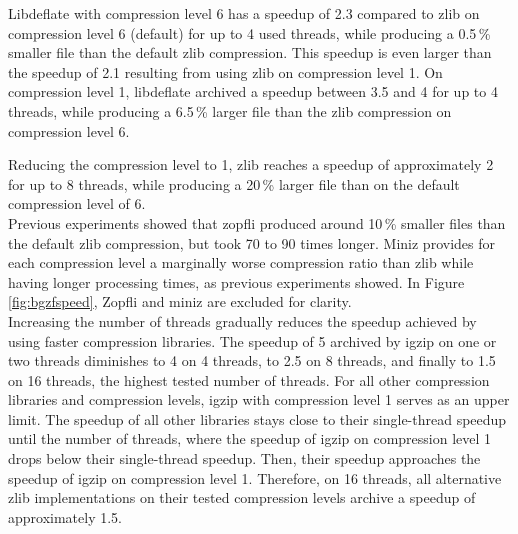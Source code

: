 Libdeflate with compression level 6 has a speedup of 2.3 compared to zlib on compression level 6 (default) for up to 4 used threads, while producing a 0.5\,\% smaller file than the default zlib compression. This speedup is even larger than the speedup of 2.1 resulting from using zlib on compression level 1. On compression level 1, libdeflate archived a speedup between 3.5 and 4 for up to 4 threads, while producing a 6.5\,\% larger file than the zlib compression on compression level 6.

Reducing the compression level to 1, zlib reaches a speedup of approximately 2 for up to 8 threads, while producing a 20\,\% larger file than on the default compression level of 6.\\

Previous experiments showed that zopfli produced around 10\,\% smaller files than the default zlib compression, but took 70 to 90 times longer.   
Miniz provides for each compression level a marginally worse compression ratio than zlib while having longer processing times, as previous experiments showed. In Figure \ref{fig:bgzfspeed}, Zopfli and miniz are excluded for clarity.\\

Increasing the number of threads gradually reduces the speedup achieved by using faster compression libraries. The speedup of 5 archived by igzip on one or two threads diminishes to 4 on 4 threads, to 2.5 on 8 threads, and finally to 1.5 on 16 threads, the highest tested number of threads. For all other compression libraries and compression levels, igzip with compression level 1 serves as an upper limit. The speedup of all other libraries stays close to their single-thread speedup until the number of threads, where the speedup of igzip on compression level 1 drops below their single-thread speedup. Then, their speedup approaches the speedup of igzip on compression level 1. Therefore, on 16 threads, all alternative zlib implementations on their tested compression levels archive a speedup of approximately 1.5. 

